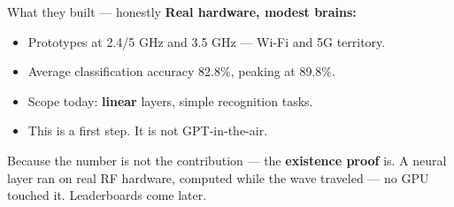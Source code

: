 \begin{frame}{What they built --- honestly}
  \large\textbf{Real hardware, modest brains:}

  \vspace{0.3em}
  \normalsize
  \begin{itemize}\itemsep4pt
    \item Prototypes at 2.4/5 GHz and 3.5 GHz --- Wi-Fi and 5G territory.
    \item Average classification accuracy 82.8\%, peaking at 89.8\%.
    \item Scope today: \textbf{linear} layers, simple recognition tasks.
    \item This is a first step. It is not GPT-in-the-air.
  \end{itemize}

  \vspace{0.2em}
     {Because the number is not the contribution --- the \textbf{existence proof}
      is. A neural layer ran on real RF hardware, computed while the wave
      traveled --- no GPU touched it. Leaderboards come later.}

  \vspace{0.2em}
\end{frame}
